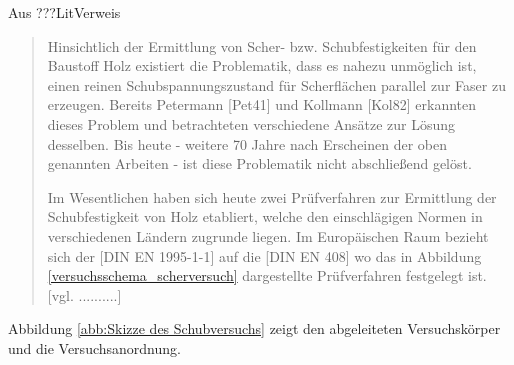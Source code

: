 Aus ???LitVerweis
\begin{quote}
Hinsichtlich der Ermittlung von Scher- bzw. Schubfestigkeiten für den Baustoff Holz
existiert die Problematik, dass es nahezu unmöglich ist, einen reinen Schubspannungszustand
für Scherflächen parallel zur Faser zu erzeugen. Bereits Petermann
[Pet41] und Kollmann [Kol82] erkannten dieses Problem und betrachteten verschiedene
Ansätze zur Lösung desselben. Bis heute - weitere 70 Jahre nach Erscheinen der
oben genannten Arbeiten - ist diese Problematik nicht abschließend gelöst.

Im Wesentlichen haben sich heute zwei Prüfverfahren zur Ermittlung der Schubfestigkeit
von Holz etabliert, welche den einschlägigen Normen in verschiedenen Ländern
zugrunde liegen. Im Europäischen Raum bezieht sich der [DIN EN 1995-1-1] auf die
[DIN EN 408] wo das in Abbildung \ref{versuchsschema_scherversuch} dargestellte Prüfverfahren festgelegt ist. [vgl. ..........]

\end{quote}

Abbildung \ref{abb:Skizze des Schubversuchs} zeigt den abgeleiteten Versuchskörper und die Versuchsanordnung.



